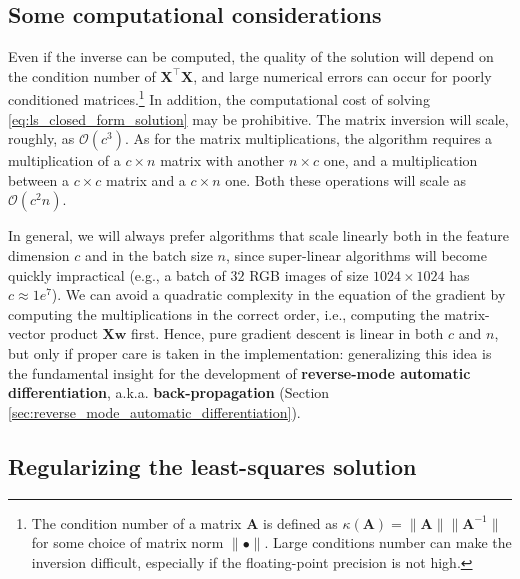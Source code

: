 \subsection{Some computational considerations}

\addteacup Even if the inverse can be computed, the quality of the solution will depend on the condition number of $\mathbf{X}^\top\mathbf{X}$, and large numerical errors can occur for poorly conditioned matrices.\footnote{The condition number of a matrix $\mathbf{A}$ is defined as $\kappa(\mathbf{A}) = \lVert\mathbf{A}\rVert\lVert\mathbf{A}^{-1}\rVert$ for some choice of matrix norm $\lVert \bullet \rVert$. Large conditions number can make the inversion difficult, especially if the floating-point precision is not high.} In addition, the computational cost of solving \eqref{eq:ls_closed_form_solution} may be prohibitive. The matrix inversion will scale, roughly, as $\mathcal{O}(c^3)$. As for the matrix multiplications, the algorithm requires a multiplication of a $c \times n$ matrix with another $n \times c$ one, and a multiplication between a $c \times c$ matrix and a $c \times n$ one. Both these operations will scale as $\mathcal{O}(c^2n)$.

In general, we will always prefer algorithms that scale linearly both in the feature dimension $c$ and in the batch size $n$, since super-linear algorithms will become quickly impractical (e.g., a batch of $32$ RGB images of size $1024 \times 1024$ has $c \approx 1e^{7}$). We can avoid a quadratic complexity in the equation of the gradient by computing the multiplications in the correct order, i.e., computing the matrix-vector product $\mathbf{X}\mathbf{w}$ first. Hence, pure gradient descent is linear in both $c$ and $n$, but only if proper care is taken in the implementation: generalizing this idea is the fundamental insight for the development of \textbf{reverse-mode automatic differentiation}, a.k.a. \textbf{back-propagation} (Section \ref{sec:reverse_mode_automatic_differentiation}).

\subsection{Regularizing the least-squares solution}
\label{subsec:regularizing_least_squares}

